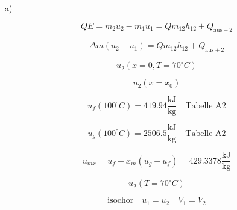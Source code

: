 a)

\[
QE = m_2 u_2 - m_1 u_1 = Q m_{12} h_{12} + Q_{\text{aus} + 2}
\]

\[
\Delta m (u_2 - u_1) = Q m_{12} h_{12} + Q_{\text{aus} + 2}
\]

\[
u_2 (x = 0, T = 70^\circ C)
\]

\[
u_2 (x = x_0)
\]

\[
u_f (100^\circ C) = 419.94 \frac{\text{kJ}}{\text{kg}} \quad \text{Tabelle A2}
\]

\[
u_g (100^\circ C) = 2506.5 \frac{\text{kJ}}{\text{kg}} \quad \text{Tabelle A2}
\]

\[
u_{m x} = u_f + x_m (u_g - u_f) = 429.3378 \frac{\text{kJ}}{\text{kg}}
\]

\[
u_2 (T = 70^\circ C)
\]

\[
\text{isochor} \quad u_1 = u_2 \quad V_1 = V_2
\]